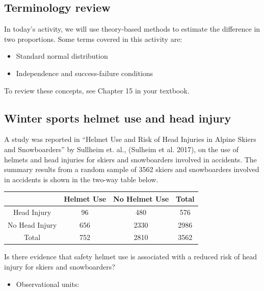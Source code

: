 \documentclass[
]{report}
\newcounter{none} %
\providecommand{\tightlist}{%
  \setlength{\itemsep}{0pt}\setlength{\parskip}{0pt}}
\begin{document}
\subsection{Terminology review}\label{terminology-review-15}

In today's activity, we will use theory-based methods to estimate the difference in two proportions. Some terms covered in this activity are:

\begin{itemize}
\item
  Standard normal distribution
\item
  Independence and success-failure conditions
\end{itemize}

To review these concepts, see Chapter 15 in your textbook.

\subsection{Winter sports helmet use and head injury}\label{winter-sports-helmet-use-and-head-injury}

A study was reported in ``Helmet Use and Risk of Head Injuries in Alpine Skiers and Snowboarders'' by Sullheim et. al., (Sulheim et al. 2017), on the use of helmets and head injuries for skiers and snowboarders involved in accidents. The summary results from a random sample of 3562 skiers and snowboarders involved in accidents is shown in the two-way table below.

{\def\LTcaptype{none} %
\begin{longtable}[]{@{}cccc@{}}
\toprule\noalign{}
& Helmet Use & No Helmet Use & Total \\
\midrule\noalign{}
\endhead
\bottomrule\noalign{}
\endlastfoot
Head Injury & 96 & 480 & 576 \\
No Head Injury & 656 & 2330 & 2986 \\
Total & 752 & 2810 & 3562 \\
\end{longtable}
}

Is there evidence that safety helmet use is associated with a reduced risk of head injury for skiers and snowboarders?

\vspace{2mm}

\begin{itemize}
\tightlist
\item
  Observational units:
\end{itemize}
\end{document}
